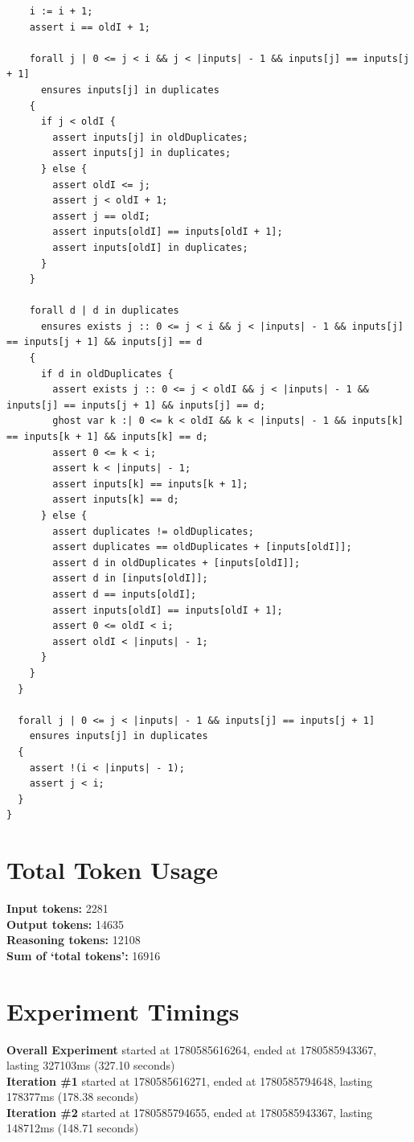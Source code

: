 \documentclass{article}
\begin{document}
\begin{lstlisting}
    i := i + 1;
    assert i == oldI + 1;

    forall j | 0 <= j < i && j < |inputs| - 1 && inputs[j] == inputs[j + 1]
      ensures inputs[j] in duplicates
    {
      if j < oldI {
        assert inputs[j] in oldDuplicates;
        assert inputs[j] in duplicates;
      } else {
        assert oldI <= j;
        assert j < oldI + 1;
        assert j == oldI;
        assert inputs[oldI] == inputs[oldI + 1];
        assert inputs[oldI] in duplicates;
      }
    }

    forall d | d in duplicates
      ensures exists j :: 0 <= j < i && j < |inputs| - 1 && inputs[j] == inputs[j + 1] && inputs[j] == d
    {
      if d in oldDuplicates {
        assert exists j :: 0 <= j < oldI && j < |inputs| - 1 && inputs[j] == inputs[j + 1] && inputs[j] == d;
        ghost var k :| 0 <= k < oldI && k < |inputs| - 1 && inputs[k] == inputs[k + 1] && inputs[k] == d;
        assert 0 <= k < i;
        assert k < |inputs| - 1;
        assert inputs[k] == inputs[k + 1];
        assert inputs[k] == d;
      } else {
        assert duplicates != oldDuplicates;
        assert duplicates == oldDuplicates + [inputs[oldI]];
        assert d in oldDuplicates + [inputs[oldI]];
        assert d in [inputs[oldI]];
        assert d == inputs[oldI];
        assert inputs[oldI] == inputs[oldI + 1];
        assert 0 <= oldI < i;
        assert oldI < |inputs| - 1;
      }
    }
  }

  forall j | 0 <= j < |inputs| - 1 && inputs[j] == inputs[j + 1]
    ensures inputs[j] in duplicates
  {
    assert !(i < |inputs| - 1);
    assert j < i;
  }
}
\end{lstlisting}
\section*{Total Token Usage}
\textbf{Input tokens: }2281
\\\textbf{Output tokens: }14635
\\\textbf{Reasoning tokens: }12108
\\\textbf{Sum of `total tokens': }16916
\section*{Experiment Timings}
\textbf{Overall Experiment} started at 1780585616264, ended at 1780585943367, lasting 327103ms (327.10 seconds)
\\\textbf{Iteration \#1} started at 1780585616271, ended at 1780585794648, lasting 178377ms (178.38 seconds)
\\\textbf{Iteration \#2} started at 1780585794655, ended at 1780585943367, lasting 148712ms (148.71 seconds)
\end{document}

